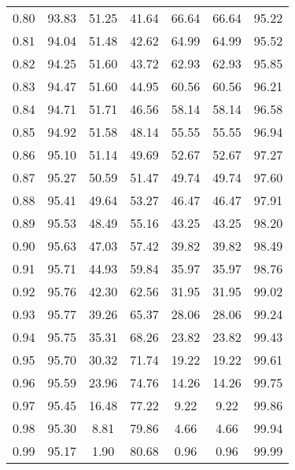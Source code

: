 \begin{tabular}{|c|c|c|c|c|c|c|}
      0.80 &     93.83 &     51.25 &      41.64 &   66.64 &      66.64 &         95.22 \\
      0.81 &     94.04 &     51.48 &      42.62 &   64.99 &      64.99 &         95.52 \\
      0.82 &     94.25 &     51.60 &      43.72 &   62.93 &      62.93 &         95.85 \\
      0.83 &     94.47 &     51.60 &      44.95 &   60.56 &      60.56 &         96.21 \\
      0.84 &     94.71 &     51.71 &      46.56 &   58.14 &      58.14 &         96.58 \\
      0.85 &     94.92 &     51.58 &      48.14 &   55.55 &      55.55 &         96.94 \\
      0.86 &     95.10 &     51.14 &      49.69 &   52.67 &      52.67 &         97.27 \\
      0.87 &     95.27 &     50.59 &      51.47 &   49.74 &      49.74 &         97.60 \\
      0.88 &     95.41 &     49.64 &      53.27 &   46.47 &      46.47 &         97.91 \\
      0.89 &     95.53 &     48.49 &      55.16 &   43.25 &      43.25 &         98.20 \\
      0.90 &     95.63 &     47.03 &      57.42 &   39.82 &      39.82 &         98.49 \\
      0.91 &     95.71 &     44.93 &      59.84 &   35.97 &      35.97 &         98.76 \\
      0.92 &     95.76 &     42.30 &      62.56 &   31.95 &      31.95 &         99.02 \\
      0.93 &     95.77 &     39.26 &      65.37 &   28.06 &      28.06 &         99.24 \\
      0.94 &     95.75 &     35.31 &      68.26 &   23.82 &      23.82 &         99.43 \\
      0.95 &     95.70 &     30.32 &      71.74 &   19.22 &      19.22 &         99.61 \\
      0.96 &     95.59 &     23.96 &      74.76 &   14.26 &      14.26 &         99.75 \\
      0.97 &     95.45 &     16.48 &      77.22 &    9.22 &       9.22 &         99.86 \\
      0.98 &     95.30 &      8.81 &      79.86 &    4.66 &       4.66 &         99.94 \\
      0.99 &     95.17 &      1.90 &      80.68 &    0.96 &       0.96 &         99.99 \\
\bottomrule
\end{tabular}
